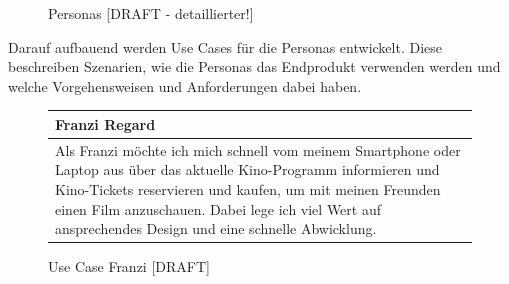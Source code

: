 		\begin{figure}[H]
			\caption[Personas ]{\label{fig:personas}Personas [DRAFT - detaillierter!] }
		\end{figure} 
		
		Darauf aufbauend werden Use Cases für die Personas entwickelt. Diese beschreiben Szenarien, wie die Personas das Endprodukt verwenden werden und welche Vorgehensweisen und Anforderungen dabei haben. 
		
		\begin{figure}[H]
			\begin{tabular}{p{13cm}}
				\textbf{Franzi Regard} \\\toprule
				Als Franzi möchte ich mich schnell vom meinem Smartphone oder Laptop aus über das aktuelle Kino-Programm informieren und Kino-Tickets reservieren und kaufen, um mit meinen Freunden einen Film anzuschauen. Dabei lege ich viel Wert auf ansprechendes Design und eine schnelle Abwicklung.
			\end{tabular}
			\caption[Use Case Franzi]{\label{fig:useCaseFranzi} Use Case Franzi [DRAFT]}
		\end{figure}
	

